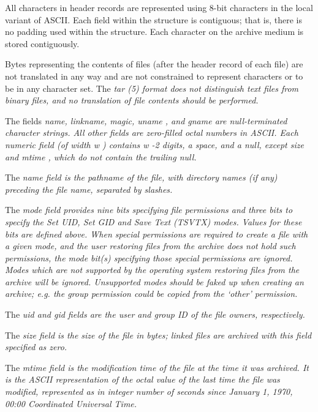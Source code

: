 \par\noindent
All characters in header records
are represented using 8-bit characters in the local
variant of ASCII.
Each field within the structure is contiguous; that is, there is
no padding used within the structure.  Each character on the archive medium
is stored contiguously.

Bytes representing the contents of files (after the header record
of each file) are not translated in any way and
are not constrained to represent characters or to be in any character set.
The %
\it tar\rm%
(5) format does not distinguish text files from binary
files, and no translation of file contents should be performed.

The fields %
\it name, linkname, magic, uname\rm%
, and %
\it gname \rm%
 are
null-terminated
character strings.  All other fields are zero-filled octal numbers in
ASCII.  Each numeric field (of width %
\it w\rm%
) contains %
\it w\rm%
-2 digits, a space, and
a null, except %
\it size \rm%
 and %
\it mtime\rm%
,
which do not contain the trailing null.

The %
\it name \rm%
 field is the pathname of the file, with directory names
(if any) preceding the file name, separated by slashes.

The %
\it mode \rm%
 field provides nine bits specifying file permissions and three
bits to specify the Set UID, Set GID and Save Text (TSVTX) modes.  Values
for these bits are defined above.  When special permissions are required
to create a file with a given mode, and the user restoring files from the
archive does not hold such permissions, the mode bit(s) specifying those
special permissions are ignored.  Modes which are not supported by the
operating system restoring files from the archive will be ignored.
Unsupported modes should be faked up when creating an archive; e.g.
the group permission could be copied from the `other' permission.

The %
\it uid \rm%
 and %
\it gid \rm%
 fields are the user and group ID of the file owners,
respectively.

The %
\it size \rm%
 field is the size of the file in bytes; linked files are archived
with this field specified as zero.

The %
\it mtime \rm%
 field is the modification time of the file at the time it was
archived.  It is the ASCII representation of the octal value of the
last time the file was modified, represented as in integer number of
seconds since January 1, 1970, 00:00 Coordinated Universal Time.

